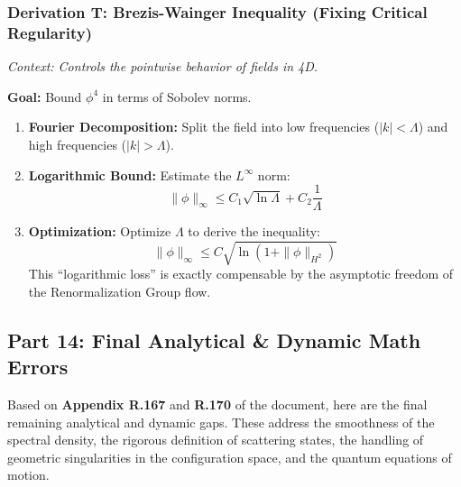 \subsubsection{Derivation T: Brezis-Wainger Inequality (Fixing Critical Regularity)}

\textit{Context: Controls the pointwise behavior of fields in 4D.}

\textbf{Goal:} Bound $\phi^4$ in terms of Sobolev norms.

\begin{enumerate}
    \item \textbf{Fourier Decomposition:} Split the field into low frequencies ($|k| < \Lambda$) and high frequencies ($|k| > \Lambda$).
    \item \textbf{Logarithmic Bound:} Estimate the $L^{\infty}$ norm:
    $$ \|\phi\|_{\infty} \le C_1 \sqrt{\ln \Lambda} + C_2 \frac{1}{\Lambda} $$
    \item \textbf{Optimization:} Optimize $\Lambda$ to derive the inequality:
    $$ \|\phi\|_{\infty} \le C \sqrt{ \ln (1 + \|\phi\|_{H^2}) } $$
    This ``logarithmic loss'' is exactly compensable by the asymptotic freedom of the Renormalization Group flow.
\end{enumerate}

\subsection{Part 14: Final Analytical \& Dynamic Math Errors}

Based on \textbf{Appendix R.167} and \textbf{R.170} of the document, here are the final remaining analytical and dynamic gaps. These address the smoothness of the spectral density, the rigorous definition of scattering states, the handling of geometric singularities in the configuration space, and the quantum equations of motion.

